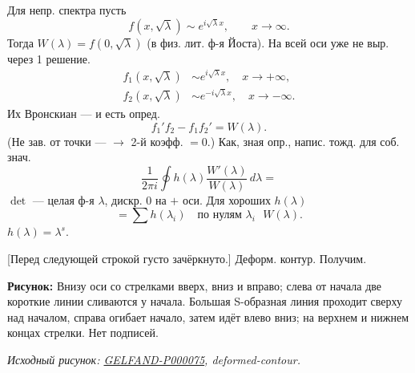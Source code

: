 \documentclass[11pt]{article}
\theoremstyle{definition}
\theoremstyle{remark}
\newcommand{\Unclear}[3]{%
  \begingroup\color{orange!70!black}%
  [Unresolved reading #1/#2: #3]\endgroup%
}
\newcommand{\SourceFigure}[3]{%
  \par\begingroup\color{blue!60!black}\textbf{\hyperref[#1:source-page]{Source figure #1/#2}:} #3%
  \par\textit{Consult the authoritative scan at this locator.}\endgroup\par%
}
\renewcommand{\Unclear}[3]{%
  \begingroup\color{orange!65!black}%
  \ifmmode\text{[неясно: #3]}\else[неясно: #3]\fi\endgroup%
}
\renewcommand{\SourceFigure}[3]{%
  \par\begingroup\color{blue!55!black}\textbf{Рисунок:} #3%
  \par{\small\textit{Исходный рисунок: \hyperref[#1:source-page]{#1}, #2.}}%
  \endgroup\par%
}
\begin{document}
Для непр. спектра пусть
\begin{equation*}f(x,\sqrt\lambda)\sim e^{i\sqrt\lambda x},\qquad x\to\infty.\end{equation*}
Тогда $W(\lambda)=f(0,\sqrt\lambda)$ (в физ. лит. ф-я Йоста).
На всей оси уже не выр. через 1 решение.
\begin{align*}
f_1(x,\sqrt\lambda)&\sim e^{i\sqrt\lambda x},\quad x\to+\infty,\\
f_2(x,\sqrt\lambda)&\sim e^{-i\sqrt\lambda x},\quad x\to-\infty.
\end{align*}
Их Вронскиан — и есть опред.
\begin{equation*}f_1'f_2-f_1f_2'=W(\lambda).\end{equation*}
(Не зав. от точки — $\to$ 2-й коэфф. $=0$.)
Как, зная опр., напис. тожд. для соб. знач.
\begin{equation*}\frac1{2\pi i}\oint h(\lambda)\frac{W'(\lambda)}{W(\lambda)}\,d\lambda=\end{equation*}
$\det$ — целая ф-я $\lambda$, дискр. $0$ на $+$ оси.
Для хороших $h(\lambda)$
\begin{equation*}=\sum h(\lambda_i)\quad\text{по нулям $\lambda_i$ $W(\lambda)$.}\end{equation*}
$h(\lambda)=\lambda^s$.
\Unclear{GELFAND-P000075}{contour-under-annotation}{Под $h(\lambda)=\lambda^s$ зачёркнуто короткое выражение: первый знак $1$ / $\lambda$, далее плохо различимые черты.}
[Перед следующей строкой густо зачёркнуто.]
Деформ. контур. Получим.
\SourceFigure{GELFAND-P000075}{deformed-contour}{Внизу оси со стрелками вверх, вниз и вправо; слева от начала две короткие линии сливаются у начала. Большая S-образная линия проходит сверху над началом, справа огибает начало, затем идёт влево вниз; на верхнем и нижнем концах стрелки. Нет подписей.}
\end{document}
